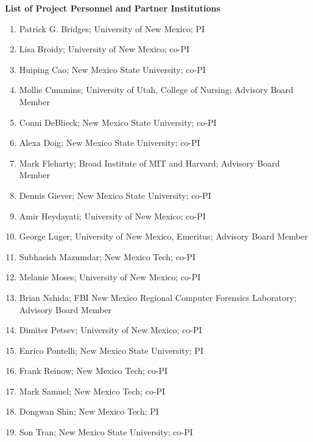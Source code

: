 \documentclass[11pt]{article}
\begin{document}
\begin{center}
{\Large\sc\bf List of Project Personnel and Partner Institutions}
\end{center}

\begin{enumerate}
\item Patrick G. Bridges; University of New Mexico; PI
\item Lisa Broidy; University of New Mexico; co-PI
\item Huiping Cao; New Mexico State University; co-PI
\item Mollie Cummins; University of Utah, College of Nursing; Advisory Board Member
\item Conni DeBlieck; New Mexico State University; co-PI
\item Alexa Doig; New Mexico State University; co-PI
\item Mark Fleharty; Broad Institute of MIT and Harvard; Advisory Board Member
\item Dennis Giever; New Mexico State University; co-PI
\item Amir Heydayati; University of New Mexico; co-PI
\item George Luger; University of New Mexico, Emeritus; Advisory Board Member
\item Subhasish Mazumdar; New Mexico Tech; co-PI
\item Melanie Moses; University of New Mexico; co-PI
\item Brian Nshida; FBI New Mexico Regional Computer Forensics Laboratory; Advisory Board Member
\item Dimiter Petsev; University of New Mexico; co-PI
\item Enrico Pontelli; New Mexico State University; PI
\item Frank Reinow; New Mexico Tech; co-PI
\item Mark Samuel; New Mexico Tech; co-PI
\item Dongwan Shin; New Mexico Tech; PI
\item Son Tran; New Mexico State University; co-PI
\end{enumerate}
\end{document}
